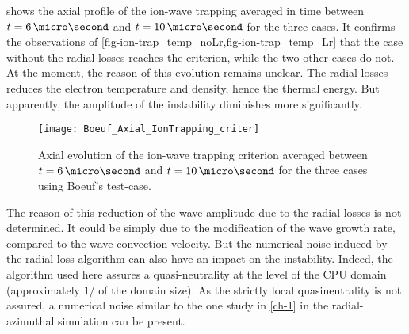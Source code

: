 shows the axial profile of the ion-wave trapping averaged in time between $t=6\,\micro\second$ and $t=10\,\micro\second$ for the three cases.
It confirms the observations of \cref{fig-ion-trap_temp_noLr,fig-ion-trap_temp_Lr} that the case without the radial losses reaches the criterion, while the two other cases do not.
At the moment, the reason of this evolution remains unclear.
The radial losses reduces the electron temperature and density, hence the thermal energy.
But apparently, the amplitude of the instability diminishes more significantly.

\begin{figure}[hbt]
  \centering
  \texttt{[image: Boeuf\_Axial\_IonTrapping\_criter]}
  \caption{Axial evolution of the ion-wave trapping criterion averaged between $t=6\,\micro\second$ and $t=10\,\micro\second$ for the three cases using Boeuf's test-case. }
  \label{fig-ionwavetrapping_axial}
\end{figure}

The reason of this reduction of the wave amplitude due to the radial losses is not determined.
It could be simply due to the modification of the wave growth rate, compared to the wave convection velocity. 
But the numerical noise induced by the radial loss algorithm can also have an impact on the instability.
Indeed, the algorithm used here assures a quasi-neutrality at the level of the CPU domain  (approximately 1/ of the domain size).
As the strictly local quasineutrality is not assured, a numerical noise similar to the one study in \cref{ch-1} in the radial-azimuthal simulation can be present. 

\FloatBarrier